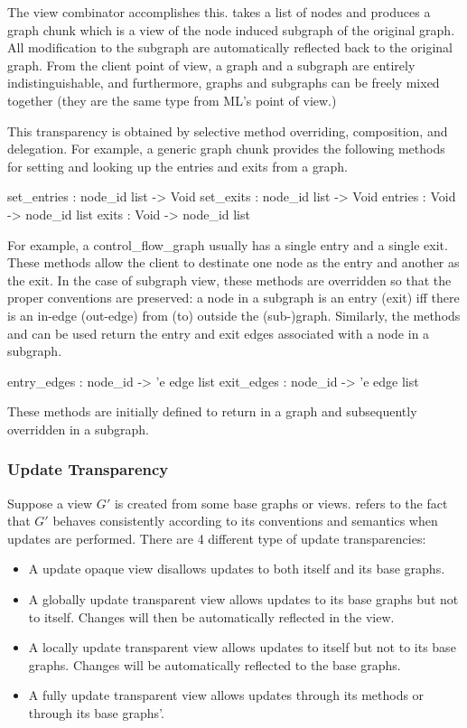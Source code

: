 The  view combinator accomplishes this.  
takes a list of nodes and produces a graph chunk which is a view of the
node induced subgraph of the original graph.
All modification to the subgraph are automatically
reflected back to the original graph.  From the client point of view,
a graph and a subgraph are entirely indistinguishable, and furthermore,
graphs and subgraphs can be freely mixed together (they are the same
type from ML's point of view.)

This transparency is obtained by selective method overriding, composition,
and delegation.  For example, a generic graph chunk provides the
following methods for setting and looking up the entries and exits
from a graph.
\begin{SML}
   set_entries  : node_id list -> Void
   set_exits    : node_id list -> Void
   entries      : Void -> node_id list
   exits        : Void -> node_id list
\end{SML}

For example, a control_flow_graph usually has a single entry and a single exit.
These methods allow the client to destinate one node as the
entry and another as
the exit.  In the case of subgraph view, these methods are overridden so
that the proper conventions are preserved:
a node in a subgraph is an entry (exit) iff there is an in-edge (out-edge)
from (to) outside the (sub-)graph.
Similarly, the methods  and  can be used
return the entry and exit edges associated with a node in a subgraph.
\begin{SML}
   entry_edges  : node_id -> 'e edge list
   exit_edges   : node_id -> 'e edge list
\end{SML}
These methods are initially defined to return \sml{[]} in a graph and
subsequently overridden in a subgraph.

\subsubsection{ Update Transparency }

Suppose a view $G'$ is created from some base graphs or views.
 refers to the fact that 
$G'$ behaves
consistently according to its conventions and semantics when updates
are performed. There are 4 different type of update transparencies:
\begin{itemize}
\item{}  A update opaque view disallows updates to both
itself and its base graphs.
\item{} A globally update transparent
view allows updates to its base graphs but not to itself.  Changes
will then be automatically reflected in the view.
\item{}  A locally update transparent
view allows updates to itself but not to its base graphs.
Changes will be automatically reflected to the base graphs.
\item{}  A fully update transparent
view allows updates through its methods or through its base
graphs'.  
\end{itemize}

